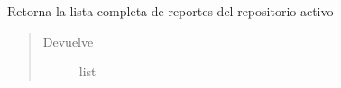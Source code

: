 \documentclass[a4paper,12pt,spanish]{sphinxmanual}
\begin{document}
\begin{fulllineitems}
\begin{fulllineitems}
\begin{description}
\begin{sphinxVerbatim}[commandchars=\\\{\}]
\end{sphinxVerbatim}

\end{description}

\end{fulllineitems}


\begin{fulllineitems}
\label{\detokenize{openerm.OermClient:openerm.OermClient.OermClient.reports}}
Retorna la lista completa de reportes del repositorio activo
\begin{quote}\begin{description}
\item[{Devuelve}] \leavevmode
list


\end{description}
\end{quote}
\end{fulllineitems}
\end{fulllineitems}
\end{document}
